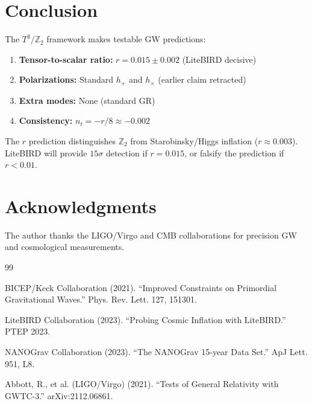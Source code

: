 \documentclass[12pt,a4paper]{article}
\begin{document}
\section{Conclusion}

The $T^3/\mathbb{Z}_2$ framework makes testable GW predictions:

\begin{enumerate}
    \item \textbf{Tensor-to-scalar ratio:} $r = 0.015 \pm 0.002$ (LiteBIRD decisive)
    \item \textbf{Polarizations:} Standard $h_+$ and $h_\times$ (earlier claim retracted)
    \item \textbf{Extra modes:} None (standard GR)
    \item \textbf{Consistency:} $n_t = -r/8 \approx -0.002$
\end{enumerate}

The $r$ prediction distinguishes $\mathbb{Z}_2$ from Starobinsky/Higgs inflation ($r \approx 0.003$). LiteBIRD will provide $15\sigma$ detection if $r = 0.015$, or falsify the prediction if $r < 0.01$.

\section*{Acknowledgments}

The author thanks the LIGO/Virgo and CMB collaborations for precision GW and cosmological measurements.

\begin{thebibliography}{99}

BICEP/Keck Collaboration (2021). ``Improved Constraints on Primordial Gravitational Waves.'' Phys. Rev. Lett. 127, 151301.

LiteBIRD Collaboration (2023). ``Probing Cosmic Inflation with LiteBIRD.'' PTEP 2023.

NANOGrav Collaboration (2023). ``The NANOGrav 15-year Data Set.'' ApJ Lett. 951, L8.

Abbott, R., et al. (LIGO/Virgo) (2021). ``Tests of General Relativity with GWTC-3.'' arXiv:2112.06861.

\end{thebibliography}
\end{document}
